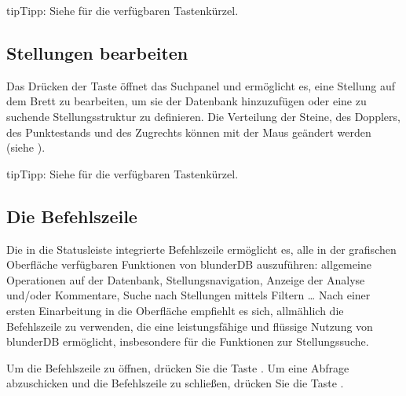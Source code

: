 \documentclass[letterpaper,10pt,german]{sphinxmanual}
\begin{document}
\begin{sphinxadmonition}{tip}{Tipp:}
\sphinxAtStartPar
Siehe {\hyperref[\detokenize{raccourcis:raccourcis}]{}} für die verfügbaren Tastenkürzel.
\end{sphinxadmonition}


\subsection{Stellungen bearbeiten}
\label{\detokenize{manuel:edition-de-positions}}\label{\detokenize{manuel:edition-positions}}
\sphinxAtStartPar
Das Drücken der Taste  öffnet das Suchpanel und ermöglicht es, eine Stellung auf dem Brett zu bearbeiten, um sie der Datenbank hinzuzufügen oder eine zu suchende Stellungsstruktur zu definieren. Die Verteilung der Steine, des Dopplers, des Punktestands und des Zugrechts können mit der Maus geändert werden (siehe {\hyperref[\detokenize{guide_utilisateur:guide-edit-position}]{}}).

\begin{sphinxadmonition}{tip}{Tipp:}
\sphinxAtStartPar
Siehe {\hyperref[\detokenize{raccourcis:raccourcis}]{}} für die verfügbaren Tastenkürzel.
\end{sphinxadmonition}


\subsection{Die Befehlszeile}
\label{\detokenize{manuel:la-ligne-de-commande}}\label{\detokenize{manuel:ligne-commande}}
\sphinxAtStartPar
Die in die Statusleiste integrierte Befehlszeile ermöglicht es, alle in der grafischen Oberfläche verfügbaren Funktionen von blunderDB auszuführen: allgemeine Operationen auf der Datenbank, Stellungsnavigation, Anzeige der Analyse und/oder Kommentare, Suche nach Stellungen mittels Filtern … Nach einer ersten Einarbeitung in die Oberfläche empfiehlt es sich, allmählich die Befehlszeile zu verwenden, die eine leistungsfähige und flüssige Nutzung von blunderDB ermöglicht, insbesondere für die Funktionen zur Stellungssuche.

\sphinxAtStartPar
Um die Befehlszeile zu öffnen, drücken Sie die Taste . Um eine Abfrage abzuschicken und die Befehlszeile zu schließen, drücken Sie die Taste .
\end{document}
